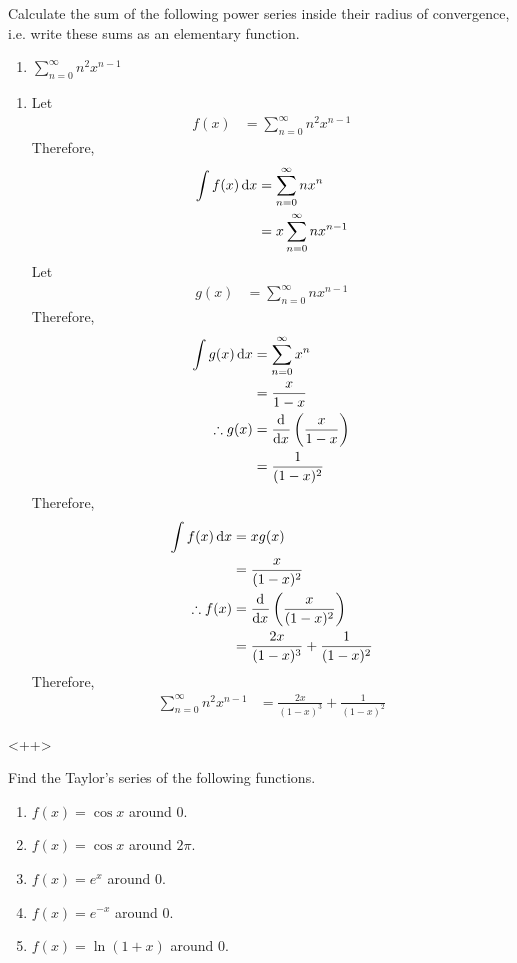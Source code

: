\documentclass[fleqn, a4paper, 12pt, oneside]{amsart}
\theoremstyle{definition}
\theoremstyle{theorem}
\begin{document}
\begin{question}
	Calculate the sum of the following power series inside their radius of convergence, i.e. write these sums as an elementary function.
	\begin{enumerate}
		\item $\sum\limits_{n = 0}^{\infty} n^2 x^{n - 1}$
	\end{enumerate}
\end{question}

\begin{solution}
	\begin{enumerate}[leftmargin = *]
		\item
			Let
			\begin{align*}
				f(x) &= \sum\limits_{n = 0}^{\infty} n^2 x^{n - 1}
			\end{align*}
			Therefore,
			\begin{align*}
				\int f(x) \dif x &= \sum\limits_{n = 0}^{\infty} n x^n\\
				&= x \sum\limits_{n = 0}^{\infty} n x^{n - 1}
			\end{align*}
			Let
			\begin{align*}
				g(x) &= \sum\limits_{n = 0}^{\infty} n x^{n - 1}
			\end{align*}
			Therefore,
			\begin{align*}
				\int g(x) \dif x &= \sum\limits_{n = 0}^{\infty} x^n\\
				&= \frac{x}{1 - x}\\
				\therefore g(x) &= \dod{}{x} \left( \frac{x}{1 - x} \right)\\
				&= \frac{1}{(1 - x)^2}
			\end{align*}
			Therefore,
			\begin{align*}
				\int f(x) \dif x &= x g(x)\\
				&= \frac{x}{(1 - x)^2}\\
				\therefore f(x) &= \dod{}{x} \left( \frac{x}{(1 - x)^2} \right)\\
				&= \frac{2 x}{(1 - x)^3} + \frac{1}{(1 - x)^2}
			\end{align*}
			Therefore,
			\begin{align*}
				\sum\limits_{n = 0}^{\infty} n^2 x^{n - 1} &= \frac{2 x}{(1 - x)^3} + \frac{1}{(1 - x)^2}
			\end{align*}
	\end{enumerate}
\end{solution}<++>

\begin{question}
	Find the Taylor's series of the following functions.
	\begin{enumerate}
		\item $f(x) = \cos x$ around $0$.
		\item $f(x) = \cos x$ around $2 \pi$.
		\item $f(x) = e^x$ around $0$.
		\item $f(x) = e^{-x}$ around $0$.
		\item $f(x) = \ln (1 + x)$ around $0$.
	\end{enumerate}
\end{question}
\end{document}
